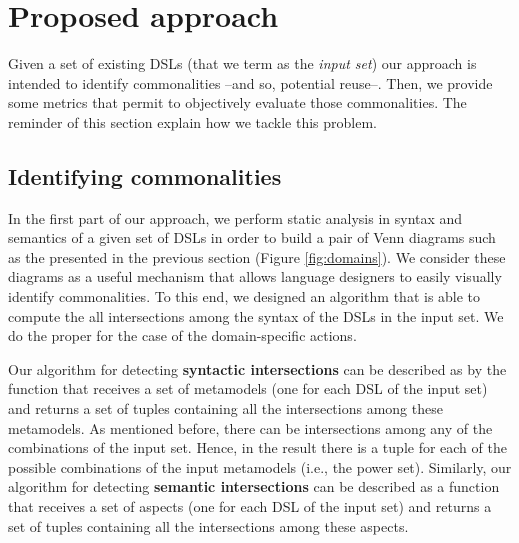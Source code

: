 \section{Proposed approach}
\label{sec:apprach}

Given a set of existing DSLs (that we term as the \textit{input set}) our approach is intended to identify commonalities --and so, potential reuse--. Then, we provide some metrics that permit to objectively evaluate those commonalities. The reminder of this section explain how we tackle this problem.

\subsection{Identifying commonalities}
\label{sec:metrics}

In the first part of our approach, we perform static analysis in syntax and semantics of a given set of DSLs in order to build a pair of Venn diagrams such as the presented in the previous section (Figure \ref{fig:domains}). We consider these diagrams as a useful mechanism that allows language designers to easily visually identify commonalities. To this end, we designed an algorithm that is able to compute the all intersections among the syntax of the DSLs in the input set. We do the proper for the case of the domain-specific actions. 

Our algorithm for detecting \textbf{syntactic intersections} can be described as by the function that receives a set of metamodels (one for each DSL of the input set) and returns a set of tuples containing all the intersections among these metamodels. As mentioned before, there can be intersections among any of the combinations of the input set. Hence, in the result there is a tuple for each of the possible combinations of the input metamodels (i.e., the power set). Similarly, our algorithm for detecting \textbf{semantic intersections} can be described as a function that receives a set of aspects (one for each DSL of the input set) and returns a set of tuples containing all the intersections among these aspects. 



